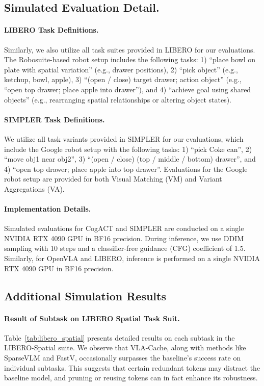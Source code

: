 \subsection{Simulated Evaluation Detail.}

\paragraph{LIBERO Task Definitions.}
Similarly, we also utilize all task suites provided in LIBERO for our evaluations. The Robosuite-based robot setup includes the following tasks: 1) ``place bowl on plate with {spatial variation}'' (e.g., drawer positions), 2) ``pick {object}'' (e.g., ketchup, bowl, apple), 3) ``(open / close) {target} drawer; {action} {object}'' (e.g., ``open top drawer; place apple into drawer''), and 4) ``achieve {goal} using shared objects'' (e.g., rearranging spatial relationships or altering object states).

\paragraph{SIMPLER Task Definitions.}
We utilize all task variants provided in SIMPLER for our evaluations, which include the Google robot setup with the following tasks: 1) ``pick Coke can'', 2) ``move {obj1} near {obj2}'', 3) ``(open / close) (top / middle / bottom) drawer'', and 4) ``open top drawer; place apple into top drawer''. Evaluations for the Google robot setup are provided for both Visual Matching (VM) and Variant Aggregations (VA).

\paragraph{Implementation Details.} Simulated evaluations for CogACT and SIMPLER are conducted on a single NVIDIA RTX 4090 GPU in BF16 precision. During inference, we use DDIM sampling with 10 steps and a classifier-free guidance (CFG) coefficient of 1.5. Similarly, for OpenVLA and LIBERO, inference is performed on a single NVIDIA RTX 4090 GPU in BF16 precision.
\subsection{Additional Simulation Results}


\paragraph{Result of Subtask on LIBERO Spatial Task Suit.}

Table~\ref{tab:libero_spatial} presents detailed results on each subtask in the LIBERO-Spatial suite. We observe that VLA-Cache, along with methods like SparseVLM and FastV, occasionally surpasses the baseline’s success rate on individual subtasks. This suggests that certain redundant tokens may distract the baseline model, and pruning or reusing tokens can in fact enhance its robustness.

